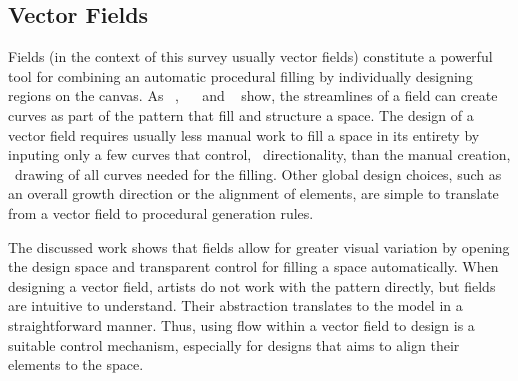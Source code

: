 \subsection{Vector Fields}
\label{subsubsec:analysis_creative_means_fields}

Fields (in the context of this survey usually vector fields) constitute a powerful tool for combining an automatic procedural filling by individually designing regions on the canvas. As \citeauthor*{hsu_2020_aef}~\cite{hsu_2020_aef}, ~\citeauthor*{saputra_2017_ffo}~\cite{saputra_2017_ffo} and \citeauthor*{gieseke_2017_ooo}~\cite{gieseke_2017_ooo} show, the streamlines of a field can create curves as part of the pattern that fill and structure a space. The design of a vector field requires usually less manual work to fill a space in its entirety by inputing only a few curves that control, \eg~directionality, than the manual creation, \eg~drawing of all curves needed for the filling. Other global design choices, such as an overall growth direction or the alignment of elements, are simple to translate from a vector field to procedural generation rules.

The discussed work shows that fields allow for greater visual variation by opening the design space and transparent control for filling a space automatically. When designing a vector field, artists do not work with the pattern directly, but fields are intuitive to understand. Their abstraction translates to the model in a straightforward manner. Thus, using flow within a vector field to design is a suitable control mechanism, especially for designs that aims to align their elements to the space.

